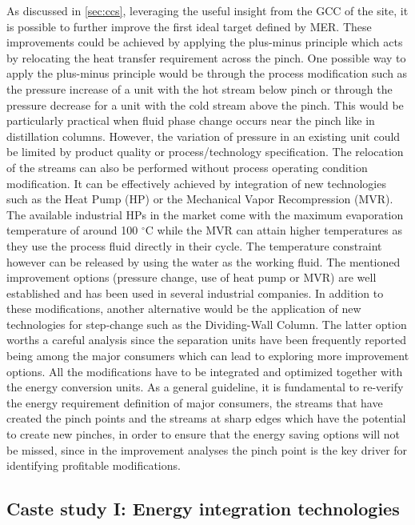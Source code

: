As discussed in \ref{sec:ccs}, leveraging the useful insight from the GCC of the site, it is possible to further improve the first ideal target defined by MER. These improvements could be achieved by applying the plus-minus principle \cite{umeda1979thermodynamic,linnhoff1984heat} which acts by relocating the heat transfer requirement across the pinch. One possible way to apply the plus-minus principle would be through the process modification such as the pressure increase of a unit with the hot stream below pinch or through the pressure decrease for a unit with the cold stream above the pinch. This would be particularly practical when fluid phase change occurs near the pinch like in distillation columns. However, the variation of pressure in an existing unit could be limited by product quality or process/technology specification. The relocation of the streams can also be performed without process operating condition modification. It can be effectively achieved by integration of new technologies such as the Heat Pump (HP) or the Mechanical Vapor Recompression (MVR). The available industrial HPs in the market come with the maximum evaporation temperature of around 100 $^{\circ}\mathrm{C}$ while the MVR can attain higher temperatures as they use the process fluid directly in their cycle. The temperature constraint however can be released by using the water as the working fluid. The mentioned improvement options (pressure change, use of heat pump or MVR) are well established and has been used in several industrial companies. In addition to these modifications, another alternative would be the application of new technologies for step-change such as the Dividing-Wall Column. The latter option worths a careful analysis since the separation units have been frequently reported being among the major consumers which can lead to exploring more improvement options. All the modifications have to be integrated and optimized together with the energy conversion units.
As a general guideline, it is fundamental to re-verify the energy requirement definition of major consumers, the streams that have created the pinch points and the streams at sharp edges which have the potential to create new pinches, in order to ensure that the energy saving options will not be missed, since in the improvement analyses the pinch point is the key driver for identifying profitable modifications.

\subsection{Caste study I: Energy integration technologies}

